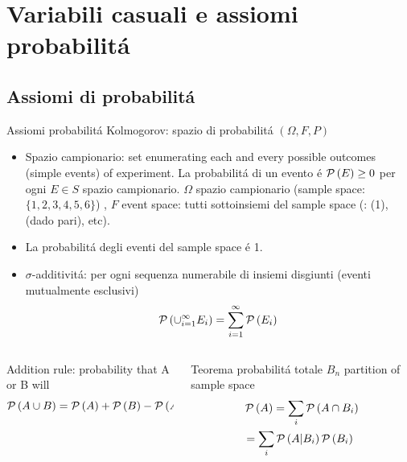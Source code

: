 \documentclass[asd-beamer.tex]{subfiles}
\begin{document}
\section{Variabili casuali e assiomi probabilit\'a}

\subsection{Assiomi di probabilit\'a}

\begin{frame}{Assiomi probabilit\'a Kolmogorov: spazio di probabilit\'a $(\Omega,F,P)$}
\begin{itemize}
\item Spazio campionario: set enumerating each and every possible outcomes (simple events) of experiment. La probabilit\'a di un evento \'e $\operatorname{\mathcal{P}}{(E)}\geq0$ per ogni $E\in S$ spazio campionario. $\Omega$ spazio campionario (sample space: $\{1,2,3,4,5,6\}$) , $F$ event space: tutti sottoinsiemi del sample space (: (1), (dado pari), etc).
\item La probabilit\'a degli eventi del sample space \'e 1.
\item $\sigma$-additivit\'a: per ogni sequenza numerabile di insiemi disgiunti (eventi mutualmente esclusivi)
\begin{equation*}
\operatorname{\mathcal{P}}{(\cup_{i=1}^{\infty}E_i)}=\sum_{i=1}^{\infty}\operatorname{\mathcal{P}}{(E_i)}
\end{equation*}
\end{itemize}
\begin{columns}[T]
	\begin{column}{0.5\textwidth}
\begin{block}{Addition rule: probability that A or B will}
\begin{equation*}
\operatorname{\mathcal{P}}{(A\cup B)}=\operatorname{\mathcal{P}}{(A)}+\operatorname{\mathcal{P}}{(B)}-\operatorname{\mathcal{P}}{(A\cap B)}
\end{equation*}
\end{block}
\end{column}
\begin{column}{0.5\textwidth}
\begin{block}{Teorema probabilit\'a totale}
$B_n$ partition of sample space
\begin{align*}
&\operatorname{\mathcal{P}}{(A)}=\sum_i\operatorname{\mathcal{P}}{(A\cap B_i)}\\
&=\sum_i\operatorname{\mathcal{P}}{(A|B_i)}\operatorname{\mathcal{P}}{(B_i)}
\end{align*}
\end{block}
\end{column}
\end{columns}
\end{frame}
\end{document}
